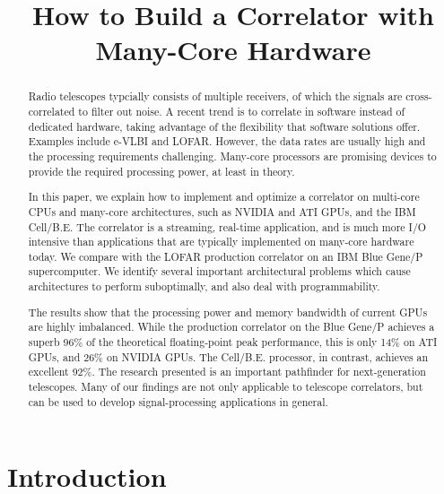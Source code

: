 \documentclass{article}
\title{How to Build a Correlator with Many-Core Hardware}
\begin{document}
\maketitle

\begin{abstract}
Radio telescopes typcially consists of multiple receivers, of which the signals
are cross-correlated to filter out noise.
A recent trend is to correlate in software instead of dedicated hardware,
taking advantage of the flexibility that software solutions offer.
Examples include e-VLBI and LOFAR.
However, the data rates are usually high and the processing requirements
challenging.
Many-core processors are promising devices to provide the required processing
power, at least in theory.

In this paper, we explain how to implement and optimize a correlator on
multi-core CPUs and many-core architectures, such as NVIDIA and ATI GPUs,
and the IBM \mbox{Cell/B.E.}  The correlator is a streaming, real-time
application, and is much more I/O intensive than applications that are
typically implemented on many-core hardware today.  We compare with
the LOFAR production correlator on an IBM Blue Gene/P supercomputer.
We identify several important architectural problems which cause
architectures to perform suboptimally, and also deal with programmability. 

The results show that the processing power and memory bandwidth of
current GPUs are highly imbalanced.  While
the production correlator on the Blue Gene/P achieves a superb 96\% of the
theoretical floating-point peak performance, this is only 14\% on ATI GPUs,
and 26\% on NVIDIA GPUs.
The \mbox{Cell/B.E.} processor, in contrast, achieves an
excellent 92\%.
The research presented is an important pathfinder for next-generation
telescopes.
Many of our findings are not only applicable to telescope correlators, but can
be used to develop signal-processing applications in general.
\end{abstract}


\section{Introduction}

\end{document}
